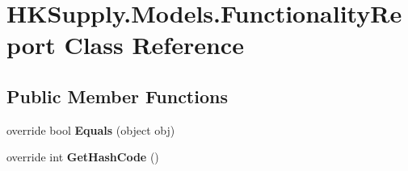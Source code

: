 \hypertarget{class_h_k_supply_1_1_models_1_1_functionality_report}{}\section{H\+K\+Supply.\+Models.\+Functionality\+Report Class Reference}
\label{class_h_k_supply_1_1_models_1_1_functionality_report}
\subsection*{Public Member Functions}
\begin{DoxyCompactItemize}
\item 
\mbox{\label{class_h_k_supply_1_1_models_1_1_functionality_report_ae22f954f935f7598fd1b8d529242b347}} 
override bool {\bfseries Equals} (object obj)
\item 
\mbox{\label{class_h_k_supply_1_1_models_1_1_functionality_report_a8e623f1d574d33102729155dc7766ebe}} 
override int {\bfseries Get\+Hash\+Code} ()
\end{DoxyCompactItemize}
